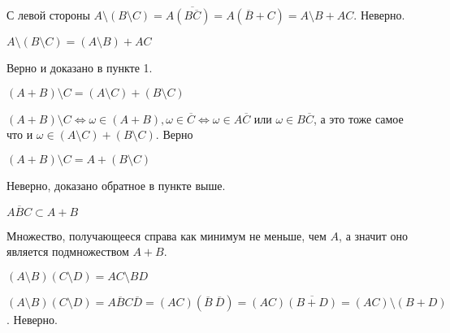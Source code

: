 \begin{solution}
С левой стороны $A \setminus \left( B \setminus C \right) = A \overline{\left( 
B  \overline{C}\right) } = A \left( \overline{B} + C \right) = A \setminus B + A C$. Неверно.
\end{solution}


\begin{subtask}{2}
$A \setminus \left( B \setminus C \right) = \left( A \setminus B \right) + AC$
\end{subtask}

\begin{solution}
Верно и доказано в пункте 1.
\end{solution}


\begin{subtask}{3}
 $\left( A + B \right) \setminus C = \left( A \setminus C \right) + \left( B \setminus C \right) $ 
\end{subtask}

\begin{solution}
$\left( A + B \right) \setminus C \Leftrightarrow \omega \in \left(A + B\right),
\omega \in \overline{C} \Leftrightarrow \omega \in A\overline{C} $ или $ \omega \in B\overline{C}$, 
а это тоже самое что и $\omega \in \left(A \setminus C\right) + \left(B \setminus C\right)$. Верно
\end{solution}


\begin{subtask}{4}
$\left( A + B \right)  \setminus C = A + \left( B \setminus C \right) $
\end{subtask}

\begin{solution}
Неверно, доказано обратное в пункте выше.
\end{solution}


\begin{subtask}{5}
$A\overline{B}C \subset A + B$
\end{subtask}

\begin{solution}
Множество, получающееся справа как минимум не меньше, чем $A$, а значит оно является 
подмножеством $A + B$.
\end{solution}


\begin{subtask}{6}
$\left(A \setminus B\right)\left(C \setminus D\right) = AC \setminus BD$
\end{subtask}

\begin{solution}
$\left(A \setminus B\right) \left(C \setminus D\right) = A\overline{B}C\overline{D} =
\left(AC\right)\left(\overline{B}~\overline{D}\right) = \left(AC\right)\overline{\left(
B + D\right)} = \left(AC\right) \setminus \left(B + D\right)$. Неверно.
\end{solution}


